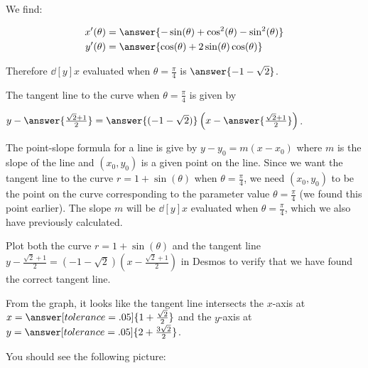 \documentclass{ximera}
\begin{document}
\begin{exercise}
\begin{exercise}
\begin{hint}
We find:

\begin{align*}
x'(\theta)&=\answer{ -\sin(\theta)+\cos^2(\theta)-\sin^2(\theta)} \\
y'(\theta)&=\answer{ \cos(\theta)+2\sin(\theta)\cos(\theta) }
\end{align*} 

Therefore $\dd[y]{x}$ evaluated when $\theta=\frac{\pi}{4}$ is $\answer{ -1-\sqrt{2}   }$.


\end{hint}

\begin{exercise}

The tangent line to the curve when $\theta=\frac{\pi}{4}$ is given by 

$y-\answer{\frac{\sqrt{2}+1}{2}   }=\answer{ ( -1-\sqrt{2} )  }\left( x- \answer{  \frac{\sqrt{2}+1}{2} }  \right)$. 

\begin{hint}


The point-slope formula for a line is give by $y-y_{0}=m(x-x_{0})$ where $m$ is the slope of the line and $(x_{0},y_{0})$ is a given point on the line. 
Since we want the tangent line to the curve $r=1+\sin(\theta)$ when $\theta=\frac{\pi}{4}$, we need $(x_{0},y_{0})$ to be the point on the curve corresponding to the parameter value $\theta=\frac{\pi}{4}$ (we found this point earlier). The slope $m$ will be $\dd[y]{x}$ evaluated when $\theta=\frac{\pi}{4}$, which we also have previously calculated. 

\end{hint}

\begin{exercise}
Plot both the curve $r= 1 + \sin(\theta)$ and the tangent line $y-\frac{\sqrt{2}+1}{2}   = ( -1-\sqrt{2} )  \left( x-  \frac{\sqrt{2}+1}{2}   \right)$ in Desmos to verify that we have found the correct tangent line.  

From the graph, it looks like the tangent line intersects the $x$-axis at $x=\answer[tolerance=.05]{ 1+ \frac{\sqrt{2}}{2} }$ and the $y$-axis at $y=\answer[tolerance=.05]{2+\frac{3\sqrt{2}}{2}}$.

\begin{hint}
You should see the following picture:


\end{hint}
\end{exercise}
\end{exercise}
\end{exercise}
\end{exercise}
\end{document}
